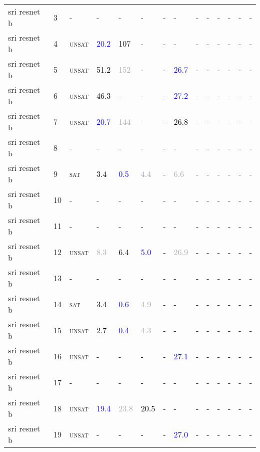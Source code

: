 \begin{center}
{\begin{longtable}{@{}llllllllllllll@{}}
sri resnet b & 3 & - & - & - & - & - & - & - & - & - & - & - & - \\
sri resnet b & 4 & \textsc{unsat} & \textcolor{blue}{20.2} & \textcolor{black}{107} & - & - & - & - & - & - & - & - & - \\
sri resnet b & 5 & \textsc{unsat} & \textcolor{black}{51.2} & \textcolor{darkgray}{152} & - & - & \textcolor{blue}{26.7} & - & - & - & - & - & - \\
sri resnet b & 6 & \textsc{unsat} & \textcolor{black}{46.3} & - & - & - & \textcolor{blue}{27.2} & - & - & - & - & - & - \\
sri resnet b & 7 & \textsc{unsat} & \textcolor{blue}{20.7} & \textcolor{darkgray}{144} & - & - & \textcolor{black}{26.8} & - & - & - & - & - & - \\
sri resnet b & 8 & - & - & - & - & - & - & - & - & - & - & - & - \\
sri resnet b & 9 & \textsc{sat} & \textcolor{black}{3.4} & \textcolor{blue}{0.5} & \textcolor{darkgray}{4.4} & - & \textcolor{darkgray}{6.6} & - & - & - & - & - & - \\
sri resnet b & 10 & - & - & - & - & - & - & - & - & - & - & - & - \\
sri resnet b & 11 & - & - & - & - & - & - & - & - & - & - & - & - \\
sri resnet b & 12 & \textsc{unsat} & \textcolor{darkgray}{8.3} & \textcolor{black}{6.4} & \textcolor{blue}{5.0} & - & \textcolor{darkgray}{26.9} & - & - & - & - & - & - \\
sri resnet b & 13 & - & - & - & - & - & - & - & - & - & - & - & - \\
sri resnet b & 14 & \textsc{sat} & \textcolor{black}{3.4} & \textcolor{blue}{0.6} & \textcolor{darkgray}{4.9} & - & - & - & - & - & - & - & - \\
sri resnet b & 15 & \textsc{unsat} & \textcolor{black}{2.7} & \textcolor{blue}{0.4} & \textcolor{darkgray}{4.3} & - & - & - & - & - & - & - & - \\
sri resnet b & 16 & \textsc{unsat} & - & - & - & - & \textcolor{blue}{27.1} & - & - & - & - & - & - \\
sri resnet b & 17 & - & - & - & - & - & - & - & - & - & - & - & - \\
sri resnet b & 18 & \textsc{unsat} & \textcolor{blue}{19.4} & \textcolor{darkgray}{23.8} & \textcolor{black}{20.5} & - & - & - & - & - & - & - & - \\
sri resnet b & 19 & \textsc{unsat} & - & - & - & - & \textcolor{blue}{27.0} & - & - & - & - & - & - \\

\end{longtable}}
\end{center}
